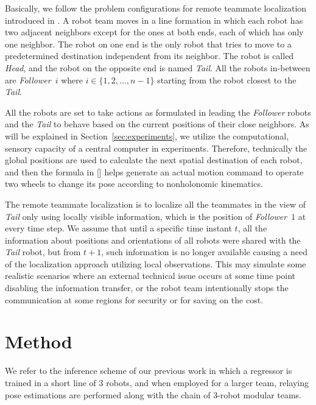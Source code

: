 \documentclass[letterpaper, 10 pt, conference]{ieeeconf}  %
\begin{document}
	Basically, we follow the problem configurations for remote teammate localization introduced in 
	\cite{Choi17}. A robot team moves in a line formation in which	each robot has 
	two adjacent neighbors except for the ones at both ends, each of which has only one neighbor. 
	The robot on one end is the only robot that tries to move to a 
	predetermined destination independent from its neighbor. The robot is called 
	\emph{Head}, and the robot on the opposite end is named \emph{Tail}. 
	All the robots in-between are \emph{Follower}~$i$ where $i \in \{1, 2, ..., n-1\}$ starting
	from the robot closest to the \emph{Tail}.
	
	All the robots are set to take actions as formulated in \cite{Choi17} leading  
	the \emph{Follower} robots and the \emph{Tail} to behave based on the 
	current positions of their close neighbors. As will be explained in 
	Section~\ref{sec:experiments}, we utilize the computational, sensory capacity of a central 
	computer in experiments. Therefore, technically the global positions are used to calculate the next 
	spatial destination of each robot, and then the formula in [] helps generate an actual motion 
	command to operate two wheels to change its pose according to nonholonomic kinematics. 
	
	The remote teammate localization is to localize all the teammates in the view of 
	\emph{Tail} only using locally visible information, which is the position of 
	\emph{Follower}~$1$ at every time step. We assume that until a specific time instant 
	$t$, all the information about positions and orientations of all robots 
	were shared with the \emph{Tail} robot, but from $t+1$, such information is no longer 
	available causing a need of the localization approach utilizing local observations.	
	This may simulate some realistic scenarios where 
	an external technical issue occurs at some time point disabling the information 
	transfer, or the robot team intentionally stops the communication at some regions for security 
	or for saving on the cost.
	 
	
	\section{Method}
	\label{sec:method}
	
	We refer to the inference scheme of our previous work \cite{Choi17} in which 
	a regressor is trained in a short line of $3$ robots, and when employed for a larger team, 
	relaying pose estimations are performed along with the chain of $3$-robot modular teams. 
	
\end{document}
